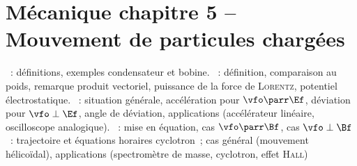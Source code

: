 \documentclass[a4paper, 12pt, final, garamond]{book}
\begin{document}
\section*{Mécanique chapitre 5 -- Mouvement de particules chargées}
\begin{enumerate}[label=\Roman*]
    ~: définitions, exemples condensateur
        et bobine.
    ~: définition, comparaison au poids,
        remarque produit vectoriel, puissance de la force de \textsc{Lorentz},
        potentiel électrostatique.
    ~: situation générale, accélération
        pour $\vfo\parr\Ef$, déviation pour $\vfo\perp\Ef$, angle de déviation,
        applications (accélérateur linéaire, oscilloscope analogique).
    ~: mise en équation, cas
        $\vfo\parr\Bf$, cas $\vfo\perp\Bf$~: trajectoire et équations horaires
        cyclotron~; cas général (mouvement hélicoïdal), applications
        (spectromètre de masse, cyclotron, effet \textsc{Hall})
\end{enumerate}
\end{document}
